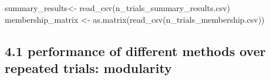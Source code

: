 \documentclass[
]{article}
\newenvironment{Shaded}{\begin{snugshade}}{\end{snugshade}}
\newcommand{\FunctionTok}[1]{\textcolor[rgb]{0.00,0.00,0.00}{#1}}
\newcommand{\NormalTok}[1]{#1}
\newcommand{\OtherTok}[1]{\textcolor[rgb]{0.56,0.35,0.01}{#1}}
\newcommand{\StringTok}[1]{\textcolor[rgb]{0.31,0.60,0.02}{#1}}
\begin{document}
\begin{Shaded}
\begin{Highlighting}[]
\NormalTok{summary\_results}\OtherTok{\textless{}{-}} \FunctionTok{read\_csv}\NormalTok{(}\StringTok{\textquotesingle{}n\_trials\_summary\_results.csv\textquotesingle{}}\NormalTok{)  }
\NormalTok{membership\_matrix }\OtherTok{\textless{}{-}} \FunctionTok{as.matrix}\NormalTok{(}\FunctionTok{read\_csv}\NormalTok{(}\StringTok{\textquotesingle{}n\_trials\_membership.csv\textquotesingle{}}\NormalTok{))}
\end{Highlighting}
\end{Shaded}

\hypertarget{performance-of-different-methods-over-repeated-trials-modularity}{%
\subsection{4.1 performance of different methods over repeated trials:
modularity}\label{performance-of-different-methods-over-repeated-trials-modularity}}
\end{document}
